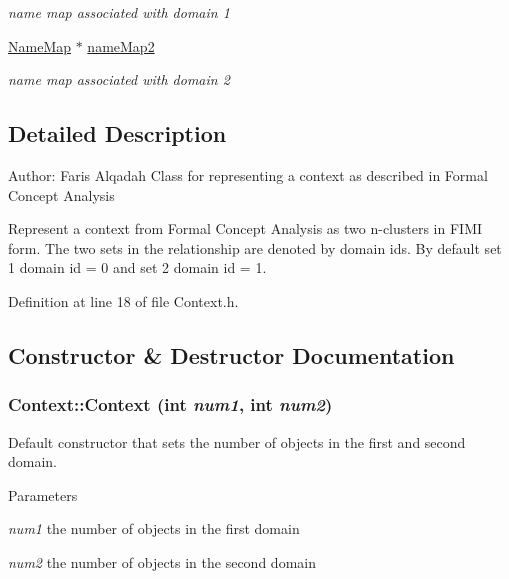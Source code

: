 \begin{DoxyCompactItemize}
\begin{DoxyCompactList}\small\item\em name map associated with domain 1 \item\end{DoxyCompactList}\item 
\hypertarget{class_context_a24bd477af8de17c09869713cfa06265a}{
\hyperlink{class_name_map}{NameMap} $\ast$ \hyperlink{class_context_a24bd477af8de17c09869713cfa06265a}{nameMap2}}
\label{class_context_a24bd477af8de17c09869713cfa06265a}

\begin{DoxyCompactList}\small\item\em name map associated with domain 2 \item\end{DoxyCompactList}\end{DoxyCompactItemize}


\subsection{Detailed Description}
Author: Faris Alqadah Class for representing a context as described in Formal Concept Analysis

Represent a context from Formal Concept Analysis as two n-\/clusters in FIMI form. The two sets in the relationship are denoted by domain ids. By default set 1 domain id = 0 and set 2 domain id = 1. 

Definition at line 18 of file Context.h.



\subsection{Constructor \& Destructor Documentation}
\hypertarget{class_context_a7c09cf1cce283bf24fed475e7084c294}{
\subsubsection[{Context}]{\setlength{\rightskip}{0pt plus 5cm}Context::Context (int {\em num1}, \/  int {\em num2})}}
\label{class_context_a7c09cf1cce283bf24fed475e7084c294}


Default constructor that sets the number of objects in the first and second domain. 


\begin{DoxyParams}{Parameters}
\item[{\em num1}]the number of objects in the first domain \item[{\em num2}]the number of objects in the second domain \end{DoxyParams}


